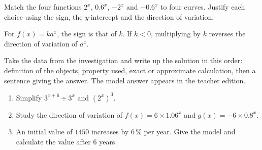 \begin{activite}
Match the four functions $2^x$, $0.6^x$, $-2^x$ and $-0.6^x$ to four curves. Justify each choice using the sign, the \textit{y}-intercept and the direction of variation.
\begin{center}\end{center}
\end{activite}

\begin{traceecrite}For $f(x)=ka^x$, the sign is that of $k$. If $k<0$, multiplying by $k$ reverses the direction of variation of $a^x$.\end{traceecrite}

\begin{exemple}
Take the data from the investigation and write up the solution in this order: definition of the objects, property used, exact or approximate calculation, then a sentence giving the answer. The model answer appears in the teacher edition.
\end{exemple}

\begin{exercice}[-- essential]
\begin{enumerate}\item Simplify $3^{x+6}\div3^x$ and $(2^x)^3$.\item Study the direction of variation of $f(x)=6\times1.06^x$ and $g(x)=-6\times0.8^x$.\item An initial value of $1450$ increases by $6\,\%$ per year. Give the model and calculate the value after $6$ years.\end{enumerate}
\end{exercice}


